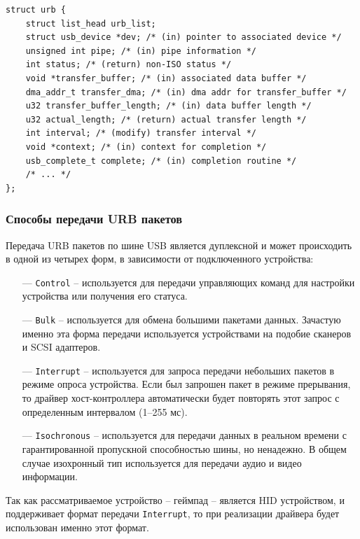 \begin{small}
\begin{verbatim}
struct urb {
    struct list_head urb_list;
    struct usb_device *dev; /* (in) pointer to associated device */
    unsigned int pipe; /* (in) pipe information */
    int status; /* (return) non-ISO status */
    void *transfer_buffer; /* (in) associated data buffer */
    dma_addr_t transfer_dma; /* (in) dma addr for transfer_buffer */
    u32 transfer_buffer_length; /* (in) data buffer length */
    u32 actual_length; /* (return) actual transfer length */
    int interval; /* (modify) transfer interval */
    void *context; /* (in) context for completion */
    usb_complete_t complete; /* (in) completion routine */
    /* ... */
};
\end{verbatim}
\end{small}

\subsubsection{Способы передачи URB пакетов}

Передача URB пакетов по шине USB является дуплексной и может происходить в одной из четырех форм, в зависимости от подключенного устройства:

\begin{itemize}[leftmargin=1.6\parindent]
    \item[---] \texttt{Control} -- используется для передачи управляющих команд для настройки устройства или получения его статуса.
    \item[---] \texttt{Bulk} -- используется для обмена большими пакетами данных. Зачастую именно эта форма передачи используется устройствами на подобие сканеров и SCSI адаптеров.
    \item[---] \texttt{Interrupt} -- используется для запроса передачи небольших пакетов в режиме опроса устройства. Если был запрошен пакет в режиме прерывания, то драйвер хост-контроллера автоматически будет повторять этот запрос с определенным интервалом (1--255 мс).
    \item[---] \texttt{Isochronous} -- используется для передачи данных в реальном времени с гарантированной пропускной способностью шины, но ненадежно. В общем случае изохронный тип используется для передачи аудио и видео информации. 
\end{itemize}

Так как рассматриваемое устройство -- геймпад -- является HID устройством, и поддерживает формат передачи \texttt{Interrupt}, то при реализации драйвера будет использован именно этот формат.


